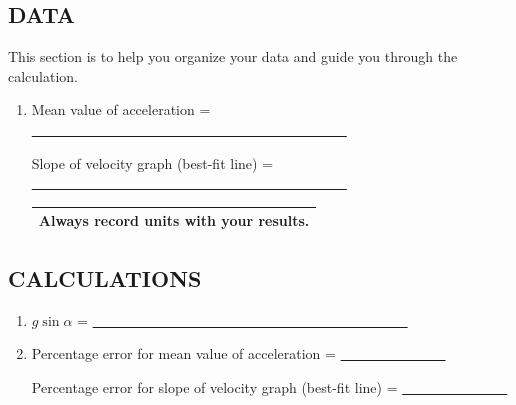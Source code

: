 \subsection*{DATA}

This section is to help you organize your data and guide you through the calculation.

\begin{enumerate}[label=\arabic*.]

\item Mean value of acceleration = \ul{~~~~~~~~~~~~~~~~~~~~~~~~~~~~~~~~~~~~~~~~~~~~~}

Slope of velocity graph (best-fit line) = \ul{~~~~~~~~~~~~~~~~~~~~~~~~~~~~~~~~~~~~~~~~~~~~~}


\begin{center}
\begin{tabular}{|p{14cm}|}
\hline\tstrut
Always record units with your results.  \bstrut\\
\hline
\end{tabular}
\end{center}

\end{enumerate}

\subsection*{CALCULATIONS}

\begin{enumerate}[start=2]

\item \(g\sin\alpha\) = \ul{~~~~~~~~~~~~~~~~~~~~~~~~~~~~~~~~~~~~~~~~~~~~~}

\item  Percentage error for mean value of acceleration = \ul{~~~~~~~~~~~~~~~}

Percentage error for slope of velocity graph (best-fit line) = \ul{~~~~~~~~~~~~~~~}


\end{enumerate}

